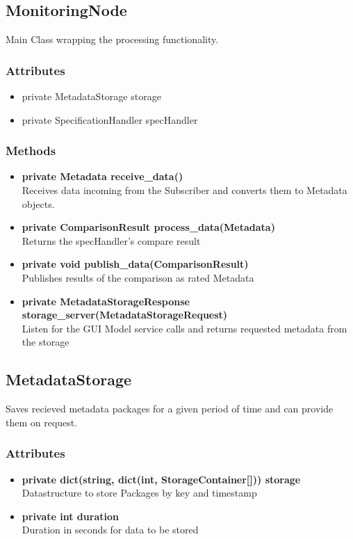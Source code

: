 
\subsection{MonitoringNode}
Main Class wrapping the processing functionality.

\subsubsection{Attributes}
\begin{itemize}
	\item private MetadataStorage storage
	\item private SpecificationHandler specHandler
\end{itemize}
\subsubsection{Methods}
\begin{itemize}
	\item \textbf{private Metadata receive\_data()}\\
	Receives data incoming from the Subscriber and converts them to Metadata objects.
	\item \textbf{private ComparisonResult process\_data(Metadata)}\\
	Returns the specHandler's compare result
	\item \textbf{private void publish\_data(ComparisonResult)}\\
	Publishes results of the comparison as rated Metadata
	\item \textbf{private MetadataStorageResponse storage\_server(MetadataStorageRequest)}\\
	Listen for the GUI Model service calls and returns requested metadata from the storage
\end{itemize}


\subsection{MetadataStorage}
Saves recieved metadata packages for a given period of time and can provide them on request.

\subsubsection{Attributes}
\begin{itemize}
	\item \textbf{private dict(string, dict(int, StorageContainer[])) storage}\\
	Datastructure to store Packages by key and timestamp
	\item \textbf{private int duration}\\
	Duration in seconds for data to be stored
\end{itemize}
